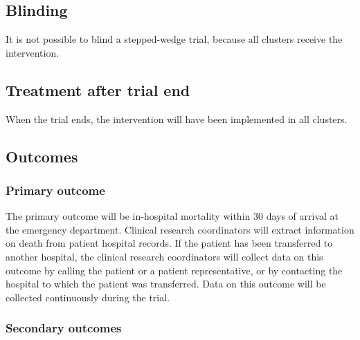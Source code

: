 \documentclass[
]{scrartcl}
\begin{document}
\hypertarget{blinding}{%
\subsection{Blinding}\label{blinding}}

It is not possible to blind a stepped-wedge trial, because all clusters
receive the intervention.

\hypertarget{treatment-after-trial-end}{%
\subsection{Treatment after trial end}\label{treatment-after-trial-end}}

When the trial ends, the intervention will have been implemented in all
clusters.

\hypertarget{outcomes}{%
\subsection{Outcomes}\label{outcomes}}

\hypertarget{primary-outcome}{%
\subsubsection{Primary outcome}\label{primary-outcome}}

The primary outcome will be in-hospital mortality within 30 days of
arrival at the emergency department. Clinical research coordinators will
extract information on death from patient hospital records. If the
patient has been transferred to another hospital, the clinical research
coordinators will collect data on this outcome by calling the patient or
a patient representative, or by contacting the hospital to which the
patient was transferred. Data on this outcome will be collected
continuously during the trial.

\hypertarget{secondary-outcomes}{%
\subsubsection{Secondary outcomes}\label{secondary-outcomes}}
\end{document}
